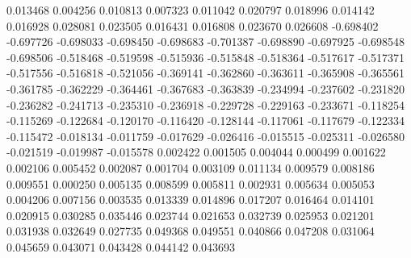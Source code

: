 0.013468
0.004256
0.010813
0.007323
0.011042
0.020797
0.018996
0.014142
0.016928
0.028081
0.023505
0.016431
0.016808
0.023670
0.026608
-0.698402
-0.697726
-0.698033
-0.698450
-0.698683
-0.701387
-0.698890
-0.697925
-0.698548
-0.698506
-0.518468
-0.519598
-0.515936
-0.515848
-0.518364
-0.517617
-0.517371
-0.517556
-0.516818
-0.521056
-0.369141
-0.362860
-0.363611
-0.365908
-0.365561
-0.361785
-0.362229
-0.364461
-0.367683
-0.363839
-0.234994
-0.237602
-0.231820
-0.236282
-0.241713
-0.235310
-0.236918
-0.229728
-0.229163
-0.233671
-0.118254
-0.115269
-0.122684
-0.120170
-0.116420
-0.128144
-0.117061
-0.117679
-0.122334
-0.115472
-0.018134
-0.011759
-0.017629
-0.026416
-0.015515
-0.025311
-0.026580
-0.021519
-0.019987
-0.015578
0.002422
0.001505
0.004044
0.000499
0.001622
0.002106
0.005452
0.002087
0.001704
0.003109
0.011134
0.009579
0.008186
0.009551
0.000250
0.005135
0.008599
0.005811
0.002931
0.005634
0.005053
0.004206
0.007156
0.003535
0.013339
0.014896
0.017207
0.016464
0.014101
0.020915
0.030285
0.035446
0.023744
0.021653
0.032739
0.025953
0.021201
0.031938
0.032649
0.027735
0.049368
0.049551
0.040866
0.047208
0.031064
0.045659
0.043071
0.043428
0.044142
0.043693
